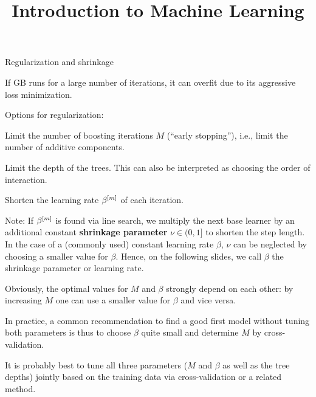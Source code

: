 






\newcommand{\titlefigure}{figure/gbm_sine_title}
\newcommand{\learninggoals}{
  \item Introducing the three main regularization options: number of iterations, tree depth and shrinkage
  \item Examples how regularization parameters influence model fit
}

\title{Introduction to Machine Learning}
\date{}






\begin{vbframe}{Regularization and shrinkage}

If GB runs for a large number of iterations, it can overfit due to its aggressive loss
minimization.

\begin{blocki}{Options for regularization:}
\item Limit the number of boosting iterations $M$ (\enquote{early stopping}), i.e., limit the number of additive components.
\item Limit the depth of the trees. This can also be interpreted as choosing the order of interaction.
\item Shorten the learning rate $\beta^{[m]}$ of each iteration.
\end{blocki}


Note: If $\beta^{[m]}$ is found via line search, we multiply the next base learner by an additional constant \textbf{shrinkage parameter} $\nu \in (0,1]$ to shorten the step length.
In the case of a (commonly used) constant learning rate $\beta$, $\nu$ can be neglected by choosing a smaller value for $\beta$.
Hence, on the following slides, we call $\beta$ the shrinkage parameter or learning rate.


\framebreak

Obviously, the optimal values for $M$ and $\beta$ strongly depend on each other:
by increasing $M$ one can use a smaller value for $\beta$ and vice versa.

\lz

In practice, a common recommendation to find a good first model without tuning both parameters is thus to choose $\beta$ quite small and determine $M$ by cross-validation. 

\lz

It is probably best to tune all three parameters ($M$ and $\beta$ as well as 
the tree depths) jointly based on the training data
via cross-validation or a related method.

\end{vbframe}

